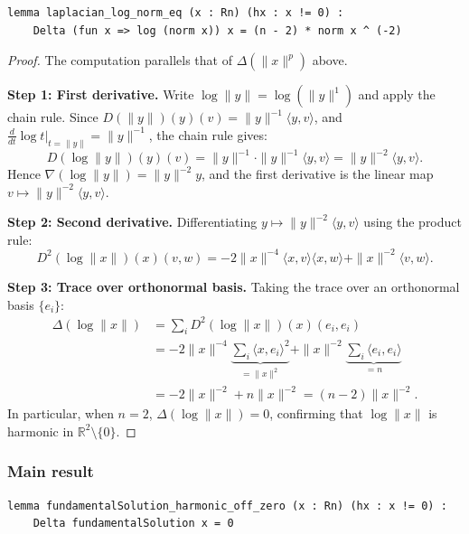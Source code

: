 ﻿\documentclass[12pt, a4paper]{article}
\renewcommand{\_}{\origunderscore\allowbreak}
\theoremstyle{definition}
\theoremstyle{plain}
\begin{document}
\begin{lstlisting}[caption={Laplacian of log norm (proved)}]
lemma laplacian_log_norm_eq (x : Rn) (hx : x != 0) :
    Delta (fun x => log (norm x)) x = (n - 2) * norm x ^ (-2)
\end{lstlisting}

\begin{proof}
The computation parallels that of $\Delta(\|x\|^p)$ above.

\textbf{Step 1: First derivative.}
Write $\log\|y\| = \log(\|y\|^1)$ and apply the chain rule.
Since $D(\|y\|)(y)(v) = \|y\|^{-1}\langle y, v\rangle$, and
$\frac{d}{dt}\log t\big|_{t=\|y\|} = \|y\|^{-1}$, the chain rule gives:
\[
  D(\log\|y\|)(y)(v) = \|y\|^{-1} \cdot \|y\|^{-1}\langle y, v\rangle
  = \|y\|^{-2}\langle y, v\rangle.
\]
Hence $\nabla(\log\|y\|) = \|y\|^{-2}y$, and the first derivative is
the linear map $v \mapsto \|y\|^{-2}\langle y, v\rangle$.

\textbf{Step 2: Second derivative.}
Differentiating $y \mapsto \|y\|^{-2}\langle y, v\rangle$ using the product rule:
\[
  D^2(\log\|x\|)(x)(v,w)
  = -2\|x\|^{-4}\langle x,v\rangle\langle x,w\rangle + \|x\|^{-2}\langle v,w\rangle.
\]

\textbf{Step 3: Trace over orthonormal basis.}
Taking the trace over an orthonormal basis $\{e_i\}$:
\begin{align*}
  \Delta(\log\|x\|)
  &= \sum_i D^2(\log\|x\|)(x)(e_i,e_i) \\
  &= -2\|x\|^{-4}\underbrace{\sum_i\langle x,e_i\rangle^2}_{=\|x\|^2}
   + \|x\|^{-2}\underbrace{\sum_i\langle e_i,e_i\rangle}_{=n} \\
  &= -2\|x\|^{-2} + n\|x\|^{-2} = (n-2)\|x\|^{-2}.
\end{align*}
In particular, when $n = 2$, $\Delta(\log\|x\|) = 0$, confirming that
$\log\|x\|$ is harmonic in $\mathbb{R}^2 \setminus \{0\}$.
\end{proof}

\subsubsection{Main result}

\begin{lstlisting}[caption={Fundamental solution is harmonic off zero (proved modulo log lemma)}]
lemma fundamentalSolution_harmonic_off_zero (x : Rn) (hx : x != 0) :
    Delta fundamentalSolution x = 0
\end{lstlisting}
\end{document}

